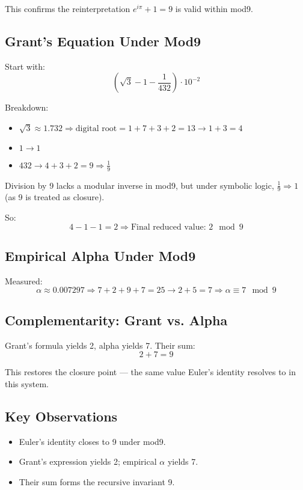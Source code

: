 \documentclass[12pt]{article}
\begin{document}
This confirms the reinterpretation \( e^{i\pi} + 1 = 9 \) is valid within mod9.

\subsection*{Grant’s Equation Under Mod9}

Start with:
\[
\left( \sqrt{3} - 1 - \frac{1}{432} \right) \cdot 10^{-2}
\]

Breakdown:
\begin{itemize}[leftmargin=1.5em]
    \item \( \sqrt{3} \approx 1.732 \Rightarrow \text{digital root} = 1 + 7 + 3 + 2 = 13 \rightarrow 1 + 3 = 4 \)
    \item \( 1 \rightarrow 1 \)
    \item \( 432 \rightarrow 4 + 3 + 2 = 9 \Rightarrow \frac{1}{9} \)
\end{itemize}

Division by 9 lacks a modular inverse in mod9, but under symbolic logic, \( \frac{1}{9} \Rightarrow 1 \) (as 9 is treated as closure).

So:
\[
4 - 1 - 1 = 2
\Rightarrow \text{Final reduced value: } 2 \mod 9
\]

\subsection*{Empirical Alpha Under Mod9}

Measured:
\[
\alpha \approx 0.007297 \Rightarrow 7 + 2 + 9 + 7 = 25 \rightarrow 2 + 5 = 7
\Rightarrow \alpha \equiv 7 \mod 9
\]

\subsection*{Complementarity: Grant vs. Alpha}

Grant’s formula yields 2, alpha yields 7. Their sum:
\[
2 + 7 = 9
\]

This restores the closure point — the same value Euler’s identity resolves to in this system.

\subsection*{Key Observations}

\begin{itemize}[leftmargin=1.5em]
    \item Euler’s identity closes to 9 under mod9.
    \item Grant’s expression yields 2; empirical \(\alpha\) yields 7.
    \item Their sum forms the recursive invariant 9.
\end{itemize}
\end{document}
